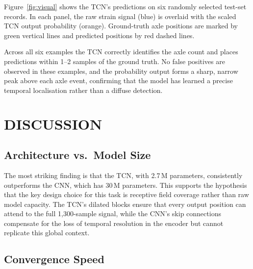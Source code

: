Figure~\ref{fig:visual} shows the TCN's predictions on six randomly selected
test-set records. In each panel, the raw strain signal (blue) is overlaid with
the scaled TCN output probability (orange). Ground-truth axle positions are
marked by green vertical lines and predicted positions by red dashed lines.

Across all six examples the TCN correctly identifies the axle count and places
predictions within 1--2 samples of the ground truth. No false positives are
observed in these examples, and the probability output forms a sharp, narrow peak
above each axle event, confirming that the model has learned a precise temporal
localisation rather than a diffuse detection.


\section{DISCUSSION}

\subsection{Architecture vs.\ Model Size}

The most striking finding is that the TCN, with 2.7\,M parameters, consistently
outperforms the CNN, which has 30\,M parameters. This supports the hypothesis
that the key design choice for this task is receptive field coverage rather than
raw model capacity. The TCN's dilated blocks ensure that every output position
can attend to the full 1,300-sample signal, while the CNN's skip connections
compensate for the loss of temporal resolution in the encoder but cannot replicate
this global context.

\subsection{Convergence Speed}

